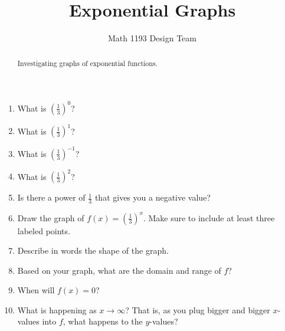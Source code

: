 \documentclass[noauthor]{ximera}
\title{Exponential Graphs}
\author{Math 1193 Design Team}
\begin{document}
\begin{abstract}
    Investigating graphs of exponential functions.
\end{abstract}
\maketitle

\begin{enumerate}
    \item What is \(\left(\frac{1}{3}\right)^0\)?
    \item What is \(\left(\frac{1}{3}\right)^1\)?
    \item What is \(\left(\frac{1}{3}\right)^{-1}\)?
    \item What is \(\left(\frac{1}{3}\right)^2\)?
    \item Is there a power of \(\frac{1}{3}\) that gives you a negative value?
    \item Draw the graph of \(f(x) =\left(\frac{1}{3}\right)^x\). Make sure to 
    include at least three labeled points.
    \item Describe in words the shape of the graph.
    \item Based on your graph, what are the domain and range of \(f\)?
    \item When will \(f(x) = 0\)?
    \item What is happening as \(x \to \infty\)? That is, as you plug
    bigger and bigger \(x\)-values into \(f\), what happens to the \(y\)-values?
\end{enumerate}
\end{document}
